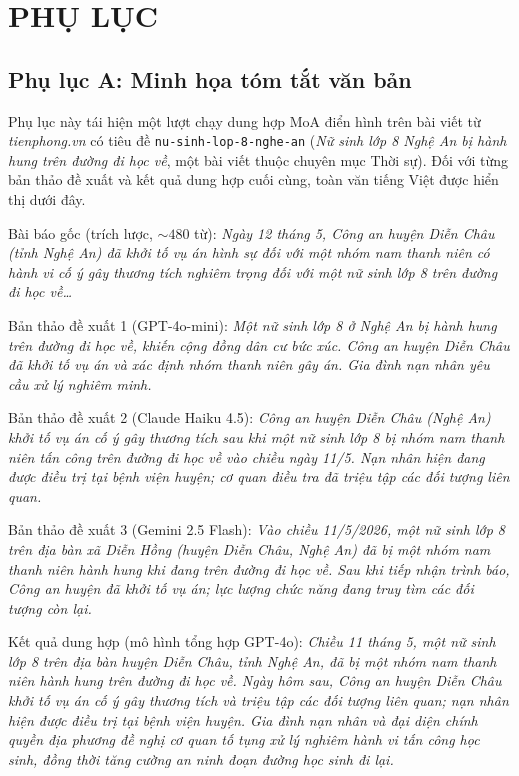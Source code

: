 \chapter*{PHỤ LỤC}

\section*{Phụ lục A: Minh họa tóm tắt văn bản}

Phụ lục này tái hiện một lượt chạy dung hợp MoA điển hình trên bài viết từ \textit{tienphong.vn} có tiêu đề \texttt{nu-sinh-lop-8-nghe-an} (\textit{Nữ sinh lớp 8 Nghệ An bị hành hung trên đường đi học về}, một bài viết thuộc chuyên mục Thời sự). Đối với từng bản thảo đề xuất và kết quả dung hợp cuối cùng, toàn văn tiếng Việt được hiển thị dưới đây.

Bài báo gốc (trích lược, $\sim 480$ từ):
\textit{Ngày 12 tháng 5, Công an huyện Diễn Châu (tỉnh Nghệ An) đã khởi tố vụ án hình sự đối với một nhóm nam thanh niên có hành vi cố ý gây thương tích nghiêm trọng đối với một nữ sinh lớp 8 trên đường đi học về\dots}

Bản thảo đề xuất 1 (GPT-4o-mini):
\textit{Một nữ sinh lớp 8 ở Nghệ An bị hành hung trên đường đi học về, khiến cộng đồng dân cư bức xúc. Công an huyện Diễn Châu đã khởi tố vụ án và xác định nhóm thanh niên gây án. Gia đình nạn nhân yêu cầu xử lý nghiêm minh.}

Bản thảo đề xuất 2 (Claude Haiku 4.5):
\textit{Công an huyện Diễn Châu (Nghệ An) khởi tố vụ án cố ý gây thương tích sau khi một nữ sinh lớp 8 bị nhóm nam thanh niên tấn công trên đường đi học về vào chiều ngày 11/5. Nạn nhân hiện đang được điều trị tại bệnh viện huyện; cơ quan điều tra đã triệu tập các đối tượng liên quan.}

Bản thảo đề xuất 3 (Gemini 2.5 Flash):
\textit{Vào chiều 11/5/2026, một nữ sinh lớp 8 trên địa bàn xã Diễn Hồng (huyện Diễn Châu, Nghệ An) đã bị một nhóm nam thanh niên hành hung khi đang trên đường đi học về. Sau khi tiếp nhận trình báo, Công an huyện đã khởi tố vụ án; lực lượng chức năng đang truy tìm các đối tượng còn lại.}

Kết quả dung hợp (mô hình tổng hợp GPT-4o):
\textit{Chiều 11 tháng 5, một nữ sinh lớp 8 trên địa bàn huyện Diễn Châu, tỉnh Nghệ An, đã bị một nhóm nam thanh niên hành hung trên đường đi học về. Ngày hôm sau, Công an huyện Diễn Châu khởi tố vụ án cố ý gây thương tích và triệu tập các đối tượng liên quan; nạn nhân hiện được điều trị tại bệnh viện huyện. Gia đình nạn nhân và đại diện chính quyền địa phương đề nghị cơ quan tố tụng xử lý nghiêm hành vi tấn công học sinh, đồng thời tăng cường an ninh đoạn đường học sinh đi lại.}


